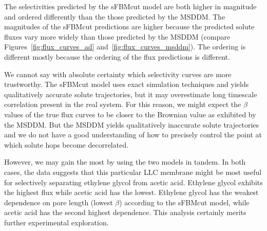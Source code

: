 \documentclass{article}
\begin{document}
  The selectivities predicted by the sFBMcut model are both higher in magnitude and
  ordered differently than the those predicted by the MSDDM. The magnitudes of the
  sFBMcut predictions are higher because the predicted solute fluxes vary more widely
  than those predicted by the MSDDM (compare Figures~\ref{fig:flux_curves_ad} 
  and~\ref{fig:flux_curves_msddm}). The ordering is different mostly because the 
  ordering of the flux predictions is different. 
  
  We cannot say with absolute certainty which selectivity curves are more 
  trustworthy. The sFBMcut model uses exact simulation techniques and yields 
  qualitatively accurate solute trajectories, but it may overestimate long 
  timescale correlation present in the real system. For this reason, we might
  expect the $\beta$ values of the true flux curves to be closer to the 
  Brownian value as exhibited by the MSDDM. But the MSDDM yields qualitatively
  inaccurate solute trajectories and we do not have a good understanding of
  how to precisely control the point at which solute hops become decorrelated.
  
  However, we may gain the most by using the two models in tandem. In both cases,  
  the data suggests that this particular LLC membrane might be most useful for 
  selectively separating ethylene glycol from acetic acid. Ethylene glycol
  exhibits the highest flux while acetic acid has the lowest. Ethylene glycol
  has the weakest dependence on pore length (lowest $\beta$) according to the
  sFBMcut model, while acetic acid has the second highest dependence. This 
  analysis certainly merits further experimental exploration.

  
\end{document}
